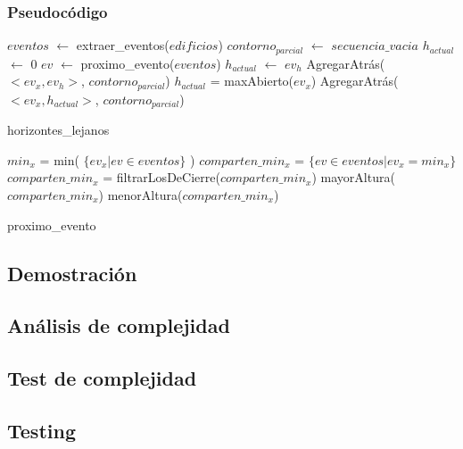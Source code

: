 \subsubsection{Pseudoc\'odigo}
\begin{algorithm}[H]
\begin{algorithmic}
\STATE $eventos$ $\gets$ extraer\_eventos($edificios$)
\STATE $contorno_{parcial}$ $\gets$ $secuencia\_vacia$
\STATE $h_{actual}$ $\gets$ 0
	\STATE $ev$ $\gets$ proximo\_evento($eventos$)
			\STATE $h_{actual}$ $\gets$ $ev_h$
			\STATE AgregarAtrás($<ev_x, ev_h>$, $contorno_{parcial}$)
		\ENDIF
	\ELSE
			\STATE $h_{actual}$ = maxAbierto($ev_x$)
			\STATE AgregarAtrás($<ev_x, h_{actual}>$, $contorno_{parcial}$)  
		\ENDIF
	\ENDIF
\ENDWHILE
\caption{horizontes\_lejanos}
\end{algorithmic}
\end{algorithm}

\begin{algorithm}[H]
\begin{algorithmic}
	\STATE $min_x$ = min( $\{ ev_x | ev \in eventos\}$ )
	\STATE $comparten\_min_x$ = $\{ ev \in eventos | ev_x = min_x \}$
		\STATE $comparten\_min_x$ = filtrarLosDeCierre($comparten\_min_x$)
		\RETURN mayorAltura($comparten\_min_x$)
	\ELSE
		\RETURN menorAltura($comparten\_min_x$)
	\ENDIF
\caption{proximo\_evento}
\end{algorithmic}
\end{algorithm}

\subsection{Demostraci\'on}


\subsection{An\'alisis de complejidad}


\subsection{Test de complejidad}

\subsection{Testing}































